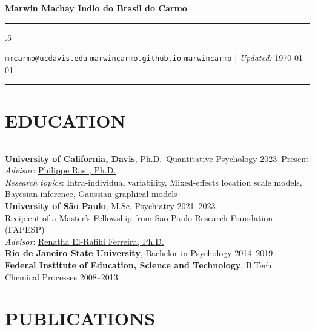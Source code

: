 \documentclass[10pt,]{article}
\begin{document}
\centerline{\huge \bf Marwin Machay Indio do Brasil do Carmo}

\vspace{2 mm}

\hrule

\vspace{2 mm}



\moveleft.5\hoffset\centerline{ \faEnvelopeO \hspace{1 mm} \href{mailto:}{\tt \href{mailto:mmcarmo@ucdavis.edu}{\nolinkurl{mmcarmo@ucdavis.edu}}} \hspace{1 mm}  \faGlobe \hspace{1 mm} \href{http://marwincarmo.github.io}{\tt marwincarmo.github.io} \hspace{1 mm}   \faGithub \hspace{1 mm} \href{http://github.com/marwincarmo}{\tt marwincarmo}   | \emph{Updated:} \today} 

\vspace{2 mm}

\hrule


\section{EDUCATION}\label{education}

\hrule

\textbf{University of California, Davis}, Ph.D.~Quantitative Psychology
\hfill 2023--Present\\
\emph{Advisor}: \href{https://rastlab.ucdavis.edu/}{Philippe Rast,
Ph.D.}\\
\emph{Research topics}: Intra-individual variability, Mixed-effects
location scale models, Bayesian inference, Gaussian graphical models\\
\textbf{University of São Paulo}, M.Sc. Psychiatry \hfill 2021--2023\\
Recipient of a Master's Fellowship from Sao Paulo Research Foundation
(FAPESP)\\
\emph{Advisor}:
\href{https://scholar.google.com.br/citations?hl=pt-BR&user=sLWIwcoAAAAJ}{Renatha
El-Rafihi Ferreira, Ph.D.}\\
\textbf{Rio de Janeiro State University}, Bachelor in Psychology
\hfill 2014--2019\\
\textbf{Federal Institute of Education, Science and Technology}, B.Tech.
Chemical Processes \hfill 2008--2013

\section{PUBLICATIONS}\label{publications}
\end{document}
